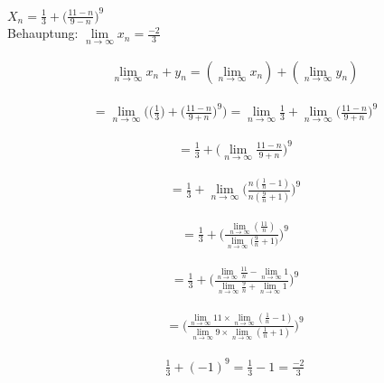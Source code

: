 \begin{example}
    $X_n = \frac{1}{3} + \big(\frac{11-n}{9-n}\big)^9$\\


    Behauptung: $\lim\limits_{n \rightarrow \infty}{x_n}=\frac{-2}{3}$

    \begin{lemma}
        \begin{gather}
            \lim\limits_{n \rightarrow \infty}{x_n+y_n}=
            (\lim\limits_{n \rightarrow \infty}{x_n}) +
            (\lim\limits_{n \rightarrow \infty}{y_n})
        \end{gather}
    \end{lemma}

    \begin{gather}
        =\lim\limits_{n \rightarrow \infty}{\bigg(\big(\frac{1}{3}\big)+\bigg(\frac{11-n}{9+n}\bigg)^9\bigg)}
        = \lim\limits_{n \rightarrow \infty}{\frac{1}{3}+
        \lim\limits_{n \rightarrow \infty}{\bigg(\frac{11-n}{9+n}\bigg)^9}}
    \end{gather}

    \begin{gather}
        = \frac{1}{3} + \bigg(\lim\limits_{n \rightarrow \infty}{\frac{11-n}{9+n}}\bigg)^9
    \end{gather}


    \begin{gather}
        = \frac{1}{3} + \lim\limits_{n \rightarrow \infty}{\Bigg(\frac{n(\frac{1}{n}-1)}{n(\frac{9}{n}+1)}\Bigg)^9}
    \end{gather}

    \begin{gather}
        = \frac{1}{3}+\Bigg(\frac{\lim\limits_{n \rightarrow \infty}{(\frac{11}{n})}}{\lim\limits_{n \rightarrow \infty}{(\frac{9}{n}+1})}\Bigg)^9
    \end{gather}

    \begin{gather}
        = \frac{1}{3} + \Bigg(
        \frac{\lim\limits_{n \rightarrow \infty}{\frac{11}{n}} - \lim\limits_{n \rightarrow \infty}{1}}{\lim\limits_{n \rightarrow \infty}{\frac{9}{n}+\lim\limits_{n \rightarrow \infty}{1} } }   \Bigg)^9
    \end{gather}


    \begin{gather}
        =\Bigg(
        \frac{\lim\limits_{n \rightarrow \infty}{11} \times \lim\limits_{n \rightarrow \infty}{(\frac{1}{n}-1)}}{\lim\limits_{n \rightarrow \infty}{9 \times \lim\limits_{n \rightarrow \infty}{(\frac{1}{n}+1)} } }   \Bigg)^9
    \end{gather}

    \begin{gather}
        \frac{1}{3}+(-1)^9 = \frac{1}{3}-1 = \frac{-2}{3}
    \end{gather}
\end{example}

